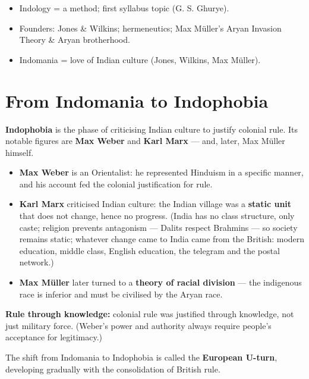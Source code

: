 \begin{QuickRevision}
\begin{itemize}
\item Indology = a method; first syllabus topic (G. S. Ghurye).
\item Founders: Jones \& Wilkins; hermeneutics; Max M\"uller's Aryan Invasion Theory \& Aryan brotherhood.
\item Indomania = love of Indian culture (Jones, Wilkins, Max M\"uller).
\end{itemize}
\end{QuickRevision}

\section{From Indomania to Indophobia}

\textbf{Indophobia} is the phase of criticising Indian culture to justify colonial rule. Its notable figures are \textbf{Max Weber} and \textbf{Karl Marx} --- and, later, Max M\"uller himself.

\begin{itemize}
\item \textbf{Max Weber} is an Orientalist: he represented Hinduism in a specific manner, and his account fed the colonial justification for rule.
\item \textbf{Karl Marx} criticised Indian culture: the Indian village was a \textbf{static unit} that does not change, hence no progress. (India has no class structure, only caste; religion prevents antagonism --- Dalits respect Brahmins --- so society remains static; whatever change came to India came from the British: modern education, middle class, English education, the telegram and the postal network.)
\item \textbf{Max M\"uller} later turned to a \textbf{theory of racial division} --- the indigenous race is inferior and must be civilised by the Aryan race.
\end{itemize}

\begin{KeyConcept}
\textbf{Rule through knowledge:} colonial rule was justified through knowledge, not just military force. (Weber's power and authority always require people's acceptance for legitimacy.)
\end{KeyConcept}

\begin{CriticalPoint}
The shift from Indomania to Indophobia is called the \textbf{European U-turn}, developing gradually with the consolidation of British rule.
\end{CriticalPoint}

